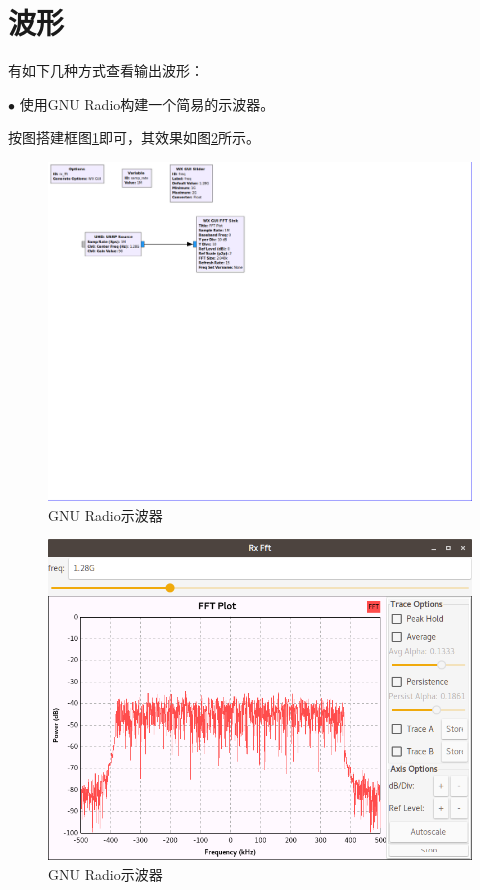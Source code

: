 	\section{波形}
		\par 有如下几种方式查看输出波形：
		\par $\bullet$ 使用GNU Radio构建一个简易的示波器。
		\par 按图搭建框图\ref{fig:dvbt_rx_fft}即可，其效果如图\ref{fig:dvbt_rx_fft_1}所示。
		\begin{figure}[htp]
			\centering
			\includegraphics[width=13cm]{figures/dvbt_rx_fft.png}
			\caption{GNU Radio示波器}
			\label{fig:dvbt_rx_fft}
		\end{figure}
		\begin{figure}[htp]
			\centering
			\includegraphics[width=13cm]{figures/dvbt_rx_fft_1.png}
			\caption{GNU Radio示波器}
			\label{fig:dvbt_rx_fft_1}
		\end{figure}
